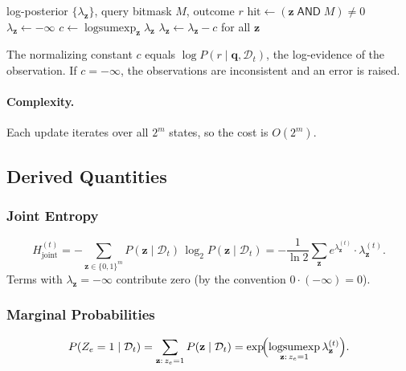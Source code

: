 \documentclass[11pt]{article}
\DeclareMathOperator{\logsumexp}{logsumexp}
\begin{document}
\begin{algorithm}[H]
\caption{Exact observation update}
\begin{algorithmic}[1]
\Require log-posterior $\{\lambda_{\mathbf{z}}\}$, query bitmask $M$, outcome $r$
  \State $\text{hit} \gets (\mathbf{z}\;\mathsf{AND}\; M) \neq 0$
    \State $\lambda_{\mathbf{z}} \gets -\infty$ 
  \EndIf
\EndFor
\State $c \gets \logsumexp_{\mathbf{z}} \lambda_{\mathbf{z}}$ 
\State $\lambda_{\mathbf{z}} \gets \lambda_{\mathbf{z}} - c$ for all $\mathbf{z}$
\end{algorithmic}
\end{algorithm}

The normalizing constant $c$ equals $\log P(r \mid \mathbf{q}, \mathcal{D}_t)$,
the log-evidence of the observation.  If $c = -\infty$, the observations
are inconsistent and an error is raised.

\paragraph{Complexity.}
Each update iterates over all $2^m$ states, so the cost is $O(2^m)$.

\subsection{Derived Quantities}

\subsubsection{Joint Entropy}
\begin{equation}
  H_{\text{joint}}^{(t)}
  = -\sum_{\mathbf{z} \in \{0,1\}^m} P(\mathbf{z} \mid \mathcal{D}_t)\,\log_2 P(\mathbf{z} \mid \mathcal{D}_t)
  = -\frac{1}{\ln 2}\sum_{\mathbf{z}} e^{\lambda_{\mathbf{z}}^{(t)}} \cdot \lambda_{\mathbf{z}}^{(t)}.
  \label{eq:joint-entropy}
\end{equation}
Terms with $\lambda_{\mathbf{z}} = -\infty$ contribute zero (by the
convention $0 \cdot (-\infty) = 0$).

\subsubsection{Marginal Probabilities}
\begin{equation}
  P(Z_e = 1 \mid \mathcal{D}_t)
  = \sum_{\mathbf{z}:\, z_e = 1} P(\mathbf{z} \mid \mathcal{D}_t)
  = \exp\!\Bigl(\logsumexp_{\mathbf{z}:\, z_e = 1} \lambda_{\mathbf{z}}^{(t)}\Bigr).
  \label{eq:exact-marginal}
\end{equation}
\end{document}
